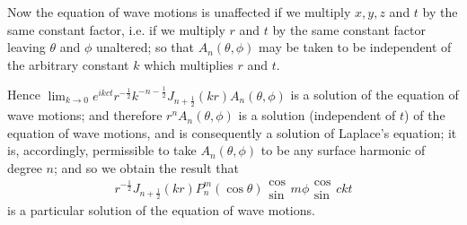 \documentclass{article}
\begin{document}
Now the equation of wave motions is unaffected if we multiply $x, y, z$ and
$t$ by the same constant factor, i.e. if we multiply $r$ and $t$ by the same
constant factor leaving $\theta$ and $\phi$ unaltered; so that $A_n (\theta,
\phi)$ may be taken to be independent of the arbitrary constant $k$ which
multiplies $r$ and $t$.

Hence $\lim_{k \to 0} e^{ikct} r^{- \frac{1}{2}} k^{- n - \frac{1}{2}} J_{n +
\frac{1}{2}}  (kr) A_n (\theta, \phi)$ is a solution of the equation of wave
motions; and therefore $r^n A_n (\theta, \phi)$ is a solution (independent of
$t$) of the equation of wave motions, and is consequently a solution of
Laplace's equation; it is, accordingly, permissible to take $A_n (\theta,
\phi)$ to be any surface harmonic of degree $n$; and so we obtain the result
that
\[ r^{- \frac{1}{2}} J_{n + \frac{1}{2}}  (kr) P_n^m (\cos \theta)
   \begin{array}{c}
     \cos\\
     \sin
   \end{array} m \phi \begin{array}{c}
     \cos\\
     \sin
   \end{array} ckt \]
is a particular solution of the equation of wave motions.
\end{document}
